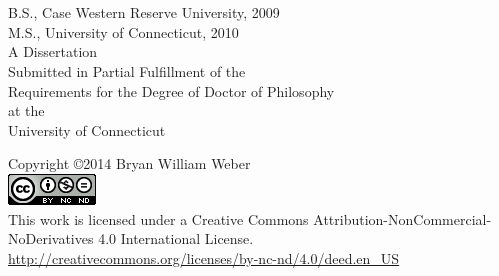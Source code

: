 \documentclass[12pt,letterpaper,oneside,final]{book}
\begin{document}
\newpage

\thispagestyle{empty}
\begin{center}
\blankline \blankline
\thetitle \\
\blankline
\theauthor \\
\blankline \blankline
B.S., Case Western Reserve University, 2009 \\
M.S., University of Connecticut, 2010 \\
\blankline \blankline \blankline \blankline \blankline \blankline
\blankline \blankline
A Dissertation \\
Submitted in Partial Fulfillment of the \\
Requirements for the Degree of Doctor of Philosophy \\
at the \\
University of Connecticut \\
\blankline {}
\end{center}
\newpage

\thispagestyle{empty}
\begin{center}
Copyright \copyright 2014 Bryan William Weber \\
\includegraphics{images/CC-license.png} \\
\blankline
This work is licensed under a Creative Commons Attribution-NonCommercial-NoDerivatives 4.0 International License. \\
\url{http://creativecommons.org/licenses/by-nc-nd/4.0/deed.en_US} \\
\blankline \blankline \blankline \blankline \blankline \blankline
\blankline \blankline \blankline \blankline \blankline \blankline
\blankline \blankline \blankline \blankline \blankline \blankline
\blankline {}
\end{center}
\newpage
\end{document}
